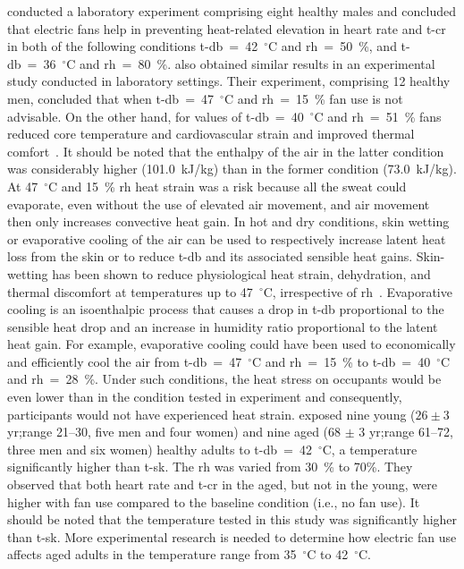  conducted a laboratory experiment comprising eight healthy males and concluded that electric fans help in preventing heat-related elevation in heart rate and \ac{t-cr} in both of the following conditions \ac{t-db}~=~42~$^{\circ}$C and \ac{rh}~=~50~\%, and \ac{t-db}~=~36~$^{\circ}$C and \ac{rh}~=~80~\%.
 also obtained similar results in an experimental study conducted in laboratory settings.
Their experiment, comprising 12 healthy men, concluded that when \ac{t-db}~=~47~$^{\circ}$C and \ac{rh}~=~15~\% fan use is not advisable.
On the other hand, for values of \ac{t-db}~=~40~$^{\circ}$C and \ac{rh}~=~51~\% fans reduced core temperature and cardiovascular strain and improved thermal comfort~\cite{Morris2019}.
It should be noted that the enthalpy of the air in the latter condition was considerably higher (101.0~kJ/kg) than in the former condition (73.0~kJ/kg).
At 47~$^{\circ}$C and 15~\% \ac{rh} heat strain was a risk because all the sweat could evaporate, even without the use of elevated air movement, and air movement then only increases convective heat gain.
In hot and dry conditions, skin wetting or evaporative cooling of the air can be used to respectively increase latent heat loss from the skin or to reduce \ac{t-db} and its associated sensible heat gains.
Skin-wetting has been shown to reduce physiological heat strain, dehydration, and thermal discomfort at temperatures up to 47~$^{\circ}$C, irrespective of \ac{rh}~\cite{Morris2019a}.
Evaporative cooling is an isoenthalpic process that causes a drop in \ac{t-db} proportional to the sensible heat drop and an increase in humidity ratio proportional to the latent heat gain.
For example, evaporative cooling could have been used to economically and efficiently cool the air from \ac{t-db}~=~47~$^{\circ}$C and \ac{rh}~=~15~\% to \ac{t-db}~=~40~$^{\circ}$C and \ac{rh}~=~28~\%\@.
Under such conditions, the heat stress on occupants would be even lower than in the condition tested in  experiment and consequently, participants would not have experienced heat strain.
 exposed nine young ($26 \pm 3$ yr;\@ range 21--30, five men and four women) and nine aged (68 $\pm$ 3 yr;\@ range 61--72, three men and six women) healthy adults to \ac{t-db}~=~42~$^{\circ}$C, a temperature significantly higher than \ac{t-sk}.
The \ac{rh} was varied from 30~\% to 70\%.
They observed that both heart rate and \ac{t-cr} in the aged, but not in the young, were higher with fan use compared to the baseline condition (i.e., no fan use).
It should be noted that the temperature tested in this study was significantly higher than \ac{t-sk}.
More experimental research is needed to determine how electric fan use affects aged adults in the temperature range from 35~$^{\circ}$C to 42~$^{\circ}$C\@.

